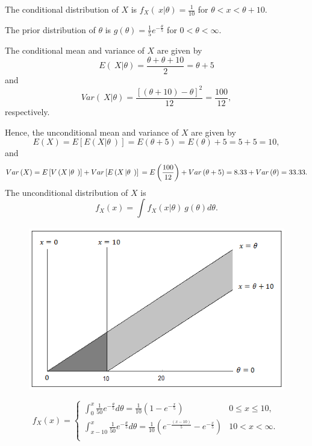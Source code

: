 \documentclass[]{book}
\theoremstyle{definition}
\theoremstyle{definition}
\theoremstyle{definition}
\theoremstyle{remark}
\begin{document}
The conditional distribution of \(X\) is
\(f_{X}\left( \left. \ x \right|\theta \right) = \frac{1}{10}\) for
\(\theta < x < \theta + 10\).

The prior distribution of \(\theta\) is
\(g\left( \theta \right) = \frac{1}{5}e^{- \frac{\theta}{5}}\) for
\(0 < \theta < \infty\).

The conditional mean and variance of \(X\) are given by
\[E\left( \left. \ X \right|\theta \right) = \frac{\theta + \theta + 10}{2} = \theta + 5\]
and
\[Var\left( \left. \ X \right|\theta \right) = \frac{\left\lbrack \left( \theta + 10 \right) - \theta \right\rbrack^{2}}{12} = \frac{100}{12}, \]
respectively.

Hence, the unconditional mean and variance of \(X\) are given by
\[E\left( X \right) = E\left\lbrack E\left( X\left| \theta \right.\  \right) \right\rbrack = E\left( \theta + 5 \right) = E\left( \theta \right) + 5 = 5 + 5 = 10,\]
and
\[Var\left( X \right) = E\left\lbrack V\left( X\left| \theta \right.\  \right) \right\rbrack + Var\left\lbrack E\left( X\left| \theta \right.\  \right) \right\rbrack \\
= E\left( \frac{100}{12} \right) + Var\left( \theta + 5 \right) = 8.33 + Var\left( \theta \right) = 33.33. \]
The unconditional distribution of \(X\) is
\[f_{X}\left( x \right) = \int_{}^{}{f_{X}\left( x |\theta \right) ~g\left( \theta \right) d \theta} .\]

\begin{figure}
\centering
\includegraphics{Figures/Fig3Exer.png}
\caption{}
\end{figure}

\[f_{X}\left( x \right) = \left\{ \begin{matrix}
\int_{0}^{x}{\frac{1}{50}e^{- \frac{\theta}{5}}d\theta = \frac{1}{10}\left( 1 - e^{- \frac{x}{5}} \right)} & 0 \leq x \leq 10, \\
\int_{x - 10}^{x}{\frac{1}{50}e^{- \frac{\theta}{5}} d\theta} = \frac{1}{10}\left( e^{- \frac{\left( x - 10 \right)}{5}} - e^{- \frac{x}{5}} \right) & 10 < x < \infty. \\
\end{matrix} \right.\ \]
\end{document}
